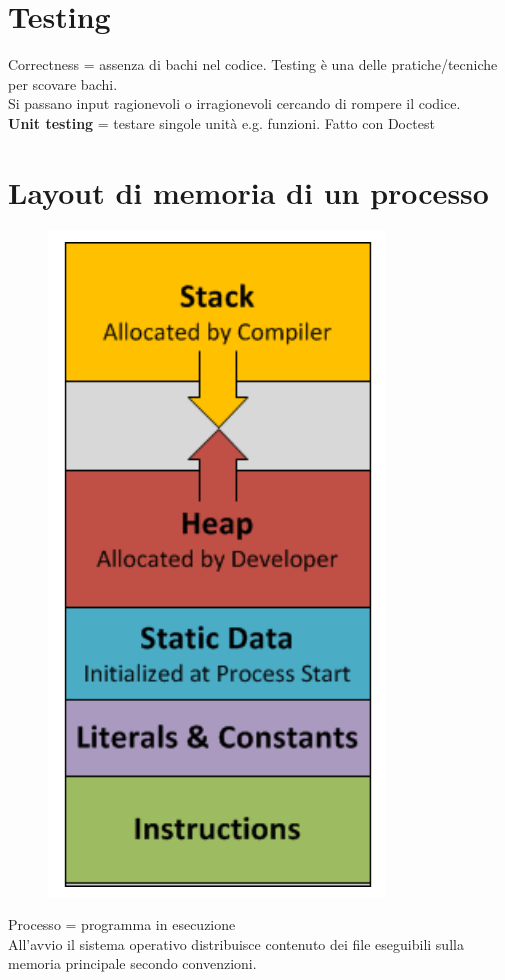 \documentclass[10pt, oneside]{book}
\begin{document}
\section{Testing}
Correctness = assenza di bachi nel codice. Testing è una delle pratiche/tecniche per scovare bachi.\\
Si passano input ragionevoli o irragionevoli cercando di rompere il codice.\\
\textbf{Unit testing} = testare singole unità e.g. funzioni. Fatto con Doctest

\section{Layout di memoria di un processo}
\begin{figure}[h!]
\centering
\includegraphics[scale=0.5]{stack.png}
\end{figure}
\noindent Processo = programma in esecuzione\\
All'avvio il sistema operativo distribuisce contenuto dei file eseguibili sulla memoria principale secondo convenzioni.
\end{document}
